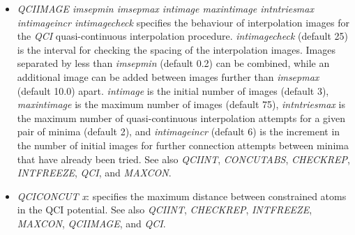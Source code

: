 \documentclass[12pt,a4paper,dvips]{article}
\begin{document}
\begin{itemize}
\item {\it QCIIMAGE imsepmin imsepmax intimage maxintimage intntriesmax intimageincr intimagecheck\/}
specifies the behaviour of interpolation images for the {\it QCI\/}
quasi-continuous interpolation procedure.
{\it intimagecheck\/} (default 25) is the interval for checking the spacing of the interpolation images.
Images separated by less than {\it imsepmin\/} (default 0.2) can be combined, while an
additional image can be added between images further than {\it imsepmax\/} (default 10.0) apart.
{\it intimage\/} is the initial number of images (default 3),
{\it maxintimage\/} is the maximum number of images (default 75),
{\it intntriesmax\/} is the maximum number of quasi-continuous interpolation
attempts for a given pair of minima (default 2), and
{\it intimageincr\/} (default 6) is the increment in the number of initial images for
further connection attempts between minima that have already been tried.
See also
{\it QCIINT\/},
{\it CONCUTABS\/},
{\it CHECKREP\/},
{\it INTFREEZE\/},
{\it QCI\/}, and
{\it MAXCON\/}.

\item{\it QCICONCUT x\/}: specifies the maximum distance between constrained atoms in the
QCI potential.
See also
{\it QCIINT\/},
{\it CHECKREP\/},
{\it INTFREEZE\/},
{\it MAXCON\/},
{\it QCIIMAGE\/}, and
{\it QCI\/}.


\end{itemize}
\end{document}
